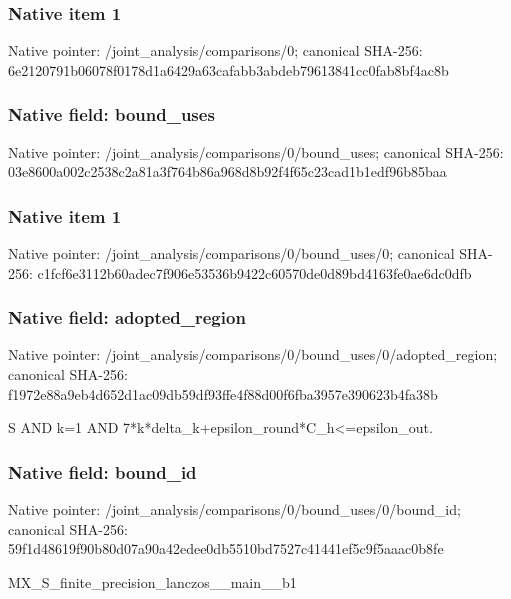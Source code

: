 \documentclass[10pt,a4paper]{article}
\begin{document}
\subsubsection{Native item 1}
Native pointer: /joint\_\allowbreak{}analysis/comparisons/0; canonical SHA-256: 6e2120791b06078f0178d1a6429a63cafabb3abdeb79613841cc0fab8bf4ac8b

\subsubsection{Native field: bound\_\allowbreak{}uses}
Native pointer: /joint\_\allowbreak{}analysis/comparisons/0/bound\_\allowbreak{}uses; canonical SHA-256: 03e8600a002c2538c2a81a3f764b86a968d8b92f4f65c23cad1b1edf96b85baa

\subsubsection{Native item 1}
Native pointer: /joint\_\allowbreak{}analysis/comparisons/0/bound\_\allowbreak{}uses/0; canonical SHA-256: c1fcf6e3112b60adec7f906e53536b9422c60570de0d89bd4163fe0ae6dc0dfb

\subsubsection{Native field: adopted\_\allowbreak{}region}
Native pointer: /joint\_\allowbreak{}analysis/comparisons/0/bound\_\allowbreak{}uses/0/adopted\_\allowbreak{}region; canonical SHA-256: f1972e88a9eb4d652d1ac09db59df93ffe4f88d00f6fba3957e390623b4fa38b

\begingroup\raggedright\sloppy S AND k=\allowbreak{}1 AND 7*k*delta\_\allowbreak{}k+epsilon\_\allowbreak{}round*C\_\allowbreak{}h<=\allowbreak{}epsilon\_\allowbreak{}out.\par\endgroup

\subsubsection{Native field: bound\_\allowbreak{}id}
Native pointer: /joint\_\allowbreak{}analysis/comparisons/0/bound\_\allowbreak{}uses/0/bound\_\allowbreak{}id; canonical SHA-256: 59f1d48619f90b80d07a90a42edee0db5510bd7527c41441ef5c9f5aaac0b8fe

\begingroup\raggedright\sloppy MX\_\allowbreak{}S\_\allowbreak{}finite\_\allowbreak{}precision\_\allowbreak{}lanczos\_\allowbreak{}\_\allowbreak{}main\_\allowbreak{}\_\allowbreak{}b1\par\endgroup
\end{document}

